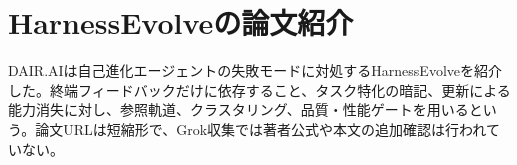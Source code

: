 \section{HarnessEvolveの論文紹介}
DAIR.AIは自己進化エージェントの失敗モードに対処するHarnessEvolveを紹介した。終端フィードバックだけに依存すること、タスク特化の暗記、更新による能力消失に対し、参照軌道、クラスタリング、品質・性能ゲートを用いるという。論文URLは短縮形で、Grok収集では著者公式や本文の追加確認は行われていない。

